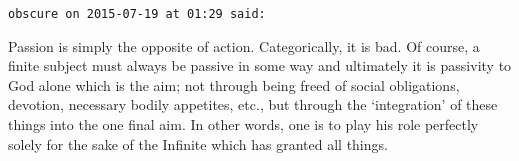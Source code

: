 \begin{footnotesize}
\begin{sffamily}
\hfill

\texttt{obscure on 2015-07-19 at 01:29 said: }

Passion is simply the opposite of action. Categorically, it is bad. Of course, a finite subject must always be passive in some way and ultimately it is passivity to God alone which is the aim; not through being freed of social obligations, devotion, necessary bodily appetites, etc., but through the `integration' of these things into the one final aim. In other words, one is to play his role perfectly solely for the sake of the Infinite which has granted all things.


\end{sffamily}\end{footnotesize}
